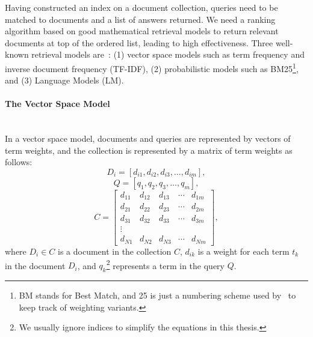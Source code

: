 Having constructed an index on a document collection, queries need to 
be matched to documents and a list of answers returned. We need a ranking algorithm based on good mathematical retrieval models to 
return relevant documents at top of the ordered list, leading to high effectiveness. 
Three well-known retrieval models are~\citep{croft2010search}: (1) vector space models such as term frequency and inverse document frequency (TF-IDF), (2) probabilistic models such as BM25\footnote{BM stands for Best Match, and 25 is just a numbering scheme used by~\cite{robertson1994some} to keep track of weighting variants.}, and (3) Language Models (LM). 

\paragraph{The Vector Space Model}
\ \\
In a vector space model, documents and queries are represented by vectors of term weights, and the collection is represented by a matrix of term weights as follows: 
\begin{displaymath} 
D_{i}=[d_{i1}, d_{i2}, d_{i3}, \ldots , d_{im}],
\end{displaymath}
\begin{displaymath} 
Q=[q_{1}, q_{2}, q_{3}, \ldots , q_{m}],
\end{displaymath}
\begin{displaymath} 
C=
\begin{bmatrix}
        d_{11} & d_{12} & d_{13} & \cdots & d_{1m}\\
        d_{21} & d_{22} & d_{23} & \cdots & d_{2m}\\
        d_{31} & d_{32} & d_{33} & \cdots & d_{3m}\\
        \vdots\\
        d_{N1} & d_{N2} & d_{N3} & \cdots & d_{Nm}
     \end{bmatrix},
\end{displaymath}
\noindent
where $ D_{i}\in C $ is a document in the collection $ C $, $ d_{ik} $ is a weight for each term $ t_{k} $ in the document $ D_{i} $, and $ q_{k} $\footnote{We usually ignore indices to simplify the equations in this thesis.} represents a term in the query $ Q $.

